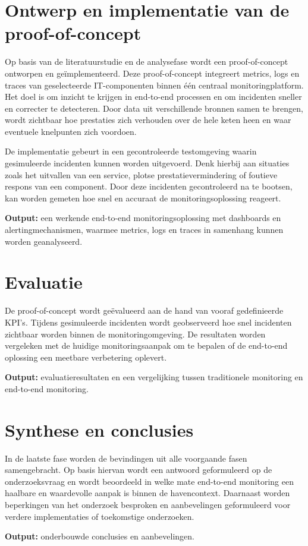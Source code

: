 \section{Ontwerp en implementatie van de proof-of-concept}

Op basis van de literatuurstudie en de analysefase wordt een proof-of-concept ontworpen en geïmplementeerd. Deze proof-of-concept integreert metrics, logs en traces van geselecteerde IT-componenten binnen één centraal monitoringplatform. Het doel is om inzicht te krijgen in end-to-end processen en om incidenten sneller en correcter te detecteren. Door data uit verschillende bronnen samen te brengen, wordt zichtbaar hoe prestaties zich verhouden over de hele keten heen en waar eventuele knelpunten zich voordoen.

De implementatie gebeurt in een gecontroleerde testomgeving waarin gesimuleerde incidenten kunnen worden uitgevoerd. Denk hierbij aan situaties zoals het uitvallen van een service, plotse prestatievermindering of foutieve respons van een component. Door deze incidenten gecontroleerd na te bootsen, kan worden gemeten hoe snel en accuraat de monitoringsoplossing reageert.

\textbf{Output:} een werkende end-to-end monitoringsoplossing met dashboards en alertingmechanismen, waarmee metrics, logs en traces in samenhang kunnen worden geanalyseerd.

\section{Evaluatie}

De proof-of-concept wordt geëvalueerd aan de hand van vooraf gedefinieerde KPI’s. Tijdens gesimuleerde incidenten wordt geobserveerd hoe snel incidenten zichtbaar worden binnen de monitoringomgeving. De resultaten worden vergeleken met de huidige monitoringsaanpak om te bepalen of de end-to-end oplossing een meetbare verbetering oplevert.

\textbf{Output:} evaluatieresultaten en een vergelijking tussen traditionele monitoring en end-to-end monitoring.

\section{Synthese en conclusies}

In de laatste fase worden de bevindingen uit alle voorgaande fasen samengebracht. Op basis hiervan wordt een antwoord geformuleerd op de onderzoeksvraag en wordt beoordeeld in welke mate end-to-end monitoring een haalbare en waardevolle aanpak is binnen de havencontext. Daarnaast worden beperkingen van het onderzoek besproken en aanbevelingen geformuleerd voor verdere implementaties of toekomstige onderzoeken.

\textbf{Output:} onderbouwde conclusies en aanbevelingen.